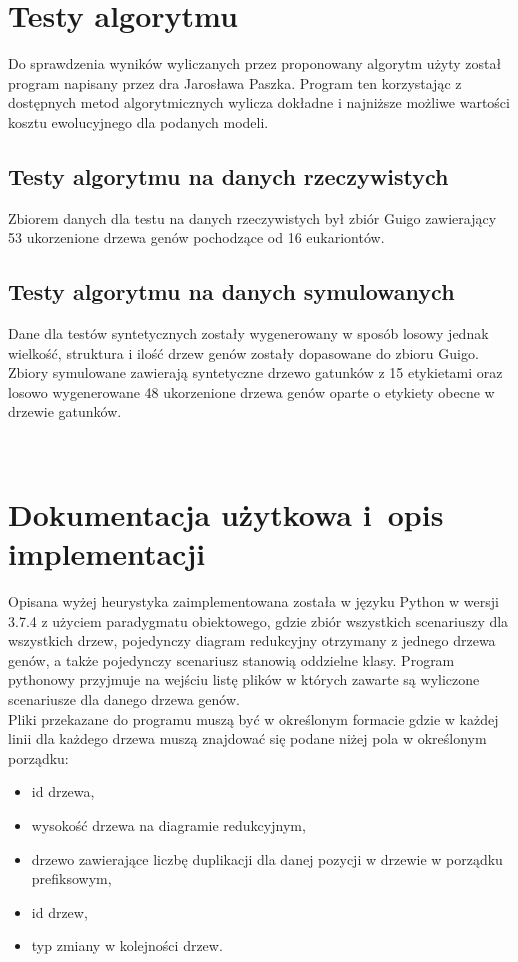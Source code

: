 \documentclass[licencjacka]{pracamgr}
\begin{document}
\section{Testy algorytmu}
Do sprawdzenia wyników wyliczanych przez proponowany algorytm użyty został program napisany przez dra Jarosława Paszka. Program ten korzystając z dostępnych metod algorytmicznych wylicza dokładne i najniższe możliwe wartości kosztu ewolucyjnego dla podanych modeli. \cite{rme}

\subsection{Testy algorytmu na danych rzeczywistych}
Zbiorem danych dla testu na danych rzeczywistych był zbiór Guigo zawierający 53 ukorzenione drzewa genów pochodzące od 16 eukariontów. 
\\[2in]

\subsection{Testy algorytmu na danych symulowanych}
Dane dla testów syntetycznych zostały wygenerowany w sposób losowy jednak wielkość, struktura i ilość drzew genów zostały dopasowane do zbioru Guigo. Zbiory symulowane zawierają syntetyczne drzewo gatunków z 15 etykietami oraz losowo wygenerowane 48 ukorzenione drzewa genów oparte o etykiety obecne w drzewie gatunków.

\\[2in]
\section{Dokumentacja użytkowa i~opis implementacji}\label{r:impl}
Opisana wyżej heurystyka zaimplementowana została w języku Python w wersji 3.7.4 z użyciem paradygmatu obiektowego, gdzie zbiór wszystkich scenariuszy dla wszystkich drzew, pojedynczy diagram redukcyjny otrzymany z jednego drzewa genów, a także pojedynczy scenariusz stanowią oddzielne klasy. Program pythonowy przyjmuje na wejściu listę plików w których zawarte są wyliczone scenariusze dla danego drzewa genów.
\\[1in]

Pliki przekazane do programu muszą być w określonym formacie gdzie w każdej linii dla każdego drzewa muszą znajdować się podane niżej pola w określonym porządku:
\begin{itemize}
\item id drzewa,
\item wysokość drzewa na diagramie redukcyjnym,
\item drzewo zawierające liczbę duplikacji dla danej pozycji w drzewie w porządku prefiksowym,
\item id drzew, 
\item typ zmiany w kolejności drzew.
\end{itemize}
\end{document}
